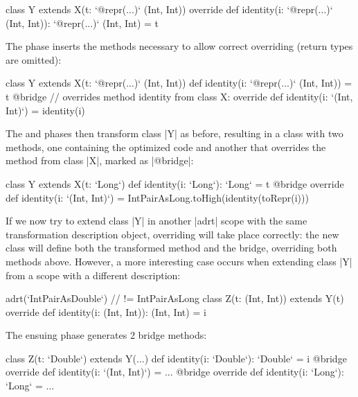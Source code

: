 \begin{lstlisting-nobreak}
class Y extends X(t: `@repr(...)` (Int, Int)) {
  override def identity(i: `@repr(...)` (Int, Int)): `@repr(...)` (Int, Int) = t
}
\end{lstlisting-nobreak}

The \bridge{} phase inserts the methods necessary to allow correct overriding (return types are omitted):

\begin{lstlisting-nobreak}
class Y extends X(t: `@repr(...)` (Int, Int)) {
  def identity(i: `@repr(...)` (Int, Int)) = t
  @bridge // overrides method identity from class X:
  override def identity(i: `(Int, Int)`) = identity(i)
}
\end{lstlisting-nobreak}

The \coerce{} and \commit{} phases then transform class |Y| as before, resulting in a class with two methods, one containing the optimized code and another that overrides the method from class |X|, marked as |@bridge|:

\begin{lstlisting-nobreak}
class Y extends X(t: `Long`) {
  def identity(i: `Long`): `Long` = t
  @bridge override def identity(i: `(Int, Int)`) =
    IntPairAsLong.toHigh(identity(toRepr(i)))
}
\end{lstlisting-nobreak}

If we now try to extend class |Y| in another |adrt| scope with the same transformation description object, overriding will take place correctly: the new class will define both the transformed method and the bridge, overriding both methods above. However, a more interesting case occurs when extending class |Y| from a scope with a different description:

\begin{lstlisting-nobreak}
adrt(`IntPairAsDouble`) { // != IntPairAsLong
  class Z(t: (Int, Int)) extends Y(t) {
    override def identity(i: (Int, Int)): (Int, Int) = i
  }
}
\end{lstlisting-nobreak}

The ensuing \bridge{} phase generates 2 bridge methods: %

\begin{lstlisting-nobreak}
class Z(t: `Double`) extends Y(...) {
  def identity(i: `Double`): `Double` = i
  @bridge override def identity(i: `(Int, Int)`) = ...
  @bridge override def identity(i: `Long`): `Long` = ...
}
\end{lstlisting-nobreak}

